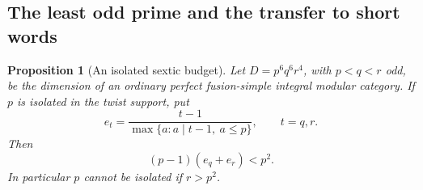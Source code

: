 \documentclass[11pt,a4paper]{article}
\numberwithin{equation}{section}
\newtheorem{proposition}[theorem]{Proposition}
\begin{document}
\subsection{The least odd prime and the transfer to short words}

\begin{proposition}[An isolated sextic budget]\label{supp:isolated-sextic}
Let $D=p^6q^6r^4$, with $p<q<r$ odd, be the dimension of
an ordinary perfect fusion-simple integral modular category.
If $p$ is isolated in the twist support, put
\[
 e_t=\frac{t-1}{\max\{a:a\mid t-1,\ a\le p\}},\qquad t=q,r.
\]
Then
\begin{equation}\label{supp:eq:sextic-budget}
                         (p-1)(e_q+e_r)<p^2.
\end{equation}
In particular $p$ cannot be isolated if $r>p^2$.
\end{proposition}
\end{document}

